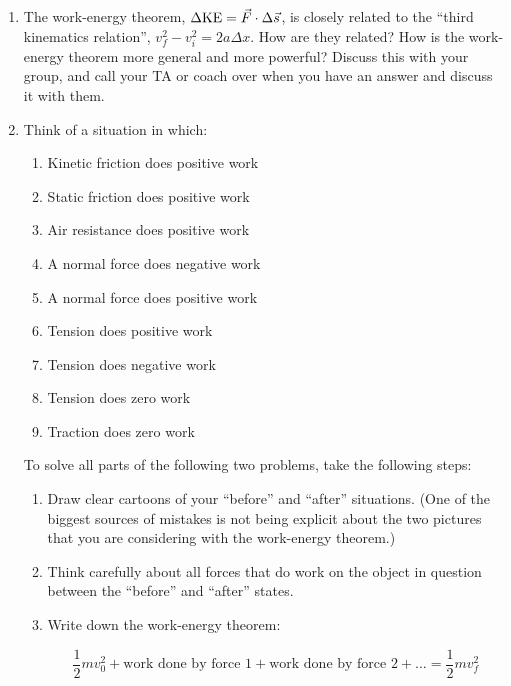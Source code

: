 \documentclass[12pt]{article}
\begin{document}
\Large
\centerline{}
\normalsize
\centerline{}

\begin{enumerate}

\item The work-energy theorem, $\Delta {\rm KE} = \vec F \cdot \Delta \vec s$, is closely related to the ``third kinematics relation'', $v_f^2 - v_i^2 = 2a\Delta x$.
How are they related? How is the work-energy theorem more general and more powerful? Discuss this with your group, and call your TA or coach over when you have
an answer and discuss it with them.

\vspace{2in}


\item Think of a situation in which:
\begin{enumerate}
\item Kinetic friction does positive work 
\item Static friction does positive work
\item Air resistance does positive work
\item A normal force does negative work
\item A normal force does positive work
\item Tension does positive work
\item Tension does negative work
\item Tension does zero work
\item Traction does zero work
\end{enumerate}

\newpage

To solve all parts of the following two problems, take the following steps:

\begin{enumerate}
\item Draw clear cartoons of your ``before'' and ``after'' situations. (One of the biggest sources of mistakes is not being explicit about the two pictures that you are considering with the work-energy theorem.)
\item Think carefully about all forces that do work on the object in question between the ``before'' and ``after'' states.
\item Write down the work-energy theorem:

$$\frac{1}{2}mv_0^2 + \text{work done by force 1} + \text{work done by force 2} + ... = \frac{1}{2}mv_f^2$$


\end{enumerate}
\end{enumerate}
\end{document}
